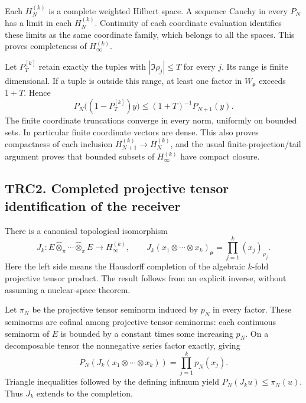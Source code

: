 Each \(H_N^{(k)}\) is a complete weighted Hilbert space. A sequence
Cauchy in every \(P_N\) has a limit in each \(H_N^{(k)}\). Continuity of
each coordinate evaluation identifies these limits as the same
coordinate family, which belongs to all the spaces. This proves
completeness of \(H_\infty^{(k)}\).

Let \(P_T^{[k]}\) retain exactly the tuples with \(|\Im\rho_j|\le T\)
for every \(j\). Its range is finite dimensional. If a tuple is outside
this range, at least one factor in \(W_{\boldsymbol\rho}\) exceeds
\(1+T\). Hence \[
P_N\bigl((1-P_T^{[k]})y\bigr)
\le (1+T)^{-1}P_{N+1}(y).
\tag{TRC1.2}
\] The finite coordinate truncations converge in every norm, uniformly
on bounded sets. In particular finite coordinate vectors are dense. This
also proves compactness of each inclusion
\(H_{N+1}^{(k)}\to H_N^{(k)}\), and the usual finite-projection/tail
argument proves that bounded subsets of \(H_\infty^{(k)}\) have compact
closure.

\subsection{TRC2. Completed projective tensor identification of the
receiver}\label{trc2.-completed-projective-tensor-identification-of-the-receiver}

There is a canonical topological isomorphism \[
J_k:E\widehat\otimes_\pi\cdots\widehat\otimes_\pi E
\longrightarrow H_\infty^{(k)},\qquad
J_k(x_1\otimes\cdots\otimes x_k)_{\boldsymbol\rho}
=\prod_{j=1}^k(x_j)_{\rho_j}.
\tag{TRC2.1}
\] Here the left side means the Hausdorff completion of the algebraic
\(k\)-fold projective tensor product. The result follows from an
explicit inverse, without assuming a nuclear-space theorem.

Let \(\pi_N\) be the projective tensor seminorm induced by \(p_N\) in
every factor. These seminorms are cofinal among projective tensor
seminorms: each continuous seminorm of \(E\) is bounded by a constant
times some increasing \(p_N\). On a decomposable tensor the nonnegative
series factor exactly, giving \[
P_N(J_k(x_1\otimes\cdots\otimes x_k))
=\prod_{j=1}^k p_N(x_j).
\tag{TRC2.2}
\] Triangle inequalities followed by the defining infimum yield
\(P_N(J_ku)\le\pi_N(u)\). Thus \(J_k\) extends to the completion.

